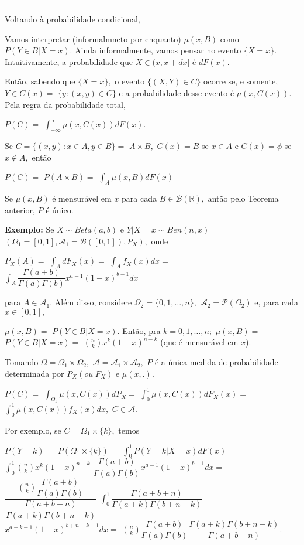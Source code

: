 \documentclass[
]{book}
\begin{document}
\begin{center}\rule{0.5\linewidth}{0.5pt}\end{center}

Voltando à probabilidade condicional,

Vamos interpretar (informalmneto por enquanto) \(\mu(x,B)\) como \(P(Y\in B| X=x).\) Ainda informalmente, vamos pensar no evento \(\{X=x\}.\) Intuitivamente, a probabilidade que \(X\in (x,x+dx]\) é \(dF(x).\)

Então, sabendo que \(\{X=x\},\) o evento \(\{(X,Y)\in C\}\) ocorre se, e somente, \(Y \in C(x)=\) \(\{y:(x,y)\in C\}\) e a probabilidade desse evento é \(\mu(x,C(x)).\) Pela regra da probabilidade total,

\(P(C)=\) \(\int_{-\infty}^{\infty}\mu(x,C(x))dF(x).\)

Se \(C=\{(x,y): x\in A, y \in B\}=\) \(A\times B,\) \(C(x)=B\) se \(x\in A\) e \(C(x)=\phi\) se \(x \notin A,\) então

\(P(C)=\) \(P(A\times B)=\) \(\int_A \mu(x,B)dF(x)\)

Se \(\mu(x,B)\) é mensurável em \(x\) para cada \(B\in \mathcal{B}(\mathbb{R}),\) antão pelo Teorema anterior, \(P\) é único.

\textbf{Exemplo:} Se \(X \sim Beta(a,b)\) e \(Y|X=x \sim Ben(n,x)\) \((\Omega_1=[0,1],\mathcal{A}_1=\mathcal{B}([0,1]),P_X),\) onde

\(P_X(A)=\) \(\int_A dF_X(x)=\) \(\int_A f_X(x)dx=\) \(\int_A \dfrac{\Gamma(a+b)}{\Gamma(a)\Gamma(b)}x^{a-1}(1-x)^{b-1}dx\)

para \(A \in \mathcal{A}_1.\) Além disso, considere \(\Omega_2=\{0,1,\ldots,n\},\) \(\mathcal{A}_2=\mathcal{P}(\Omega_2)\) e, para cada \(x \in [0,1],\)

\(\mu(x,B)=\) \(P(Y \in B| X=x).\) Então, pra \(k=0,1,\ldots,n;\) \(\mu(x,B)=\) \(P(Y\in B| X=x)=\) \(\binom{n}{k}x^k(1-x)^{n-k}\) (que é mensurável em \(x\)).

Tomando \(\Omega=\Omega_1 \times \Omega_2,\) \(\mathcal{A}=\mathcal{A}_1 \times \mathcal{A}_2,\) \(P\) é a única medida de probabilidade determinada por \(P_X (ou \; F_X)\) e \(\mu(x,.).\)

\(P(C)=\) \(\int_{\Omega_1}\mu(x,C(x))dP_X=\) \(\int_0^1 \mu(x,C(x))dF_X(x)=\) \(\int_0^1 \mu(x,C(x))f_X(x)dx,\) \(C \in\mathcal{A}.\)

Por exemplo, se \(C=\Omega_1 \times \{k\},\) temos

\(P(Y=k)=\) \(P(\Omega_1 \times \{k\})=\) \(\int_0^1P(Y=k|X=x)dF(x)=\) \(\int_0^1 \binom{n}{k}x^k(1-x)^{n-k}\) \(\dfrac{\Gamma(a+b)}{\Gamma(a)\Gamma(b)}x^{a-1}(1-x)^{b-1}dx=\) \(\dfrac{\binom{n}{k}\dfrac{\Gamma(a+b)}{\Gamma(a)\Gamma(b)}}{\dfrac{\Gamma(a+b+n)}{\Gamma(a+k)\Gamma(b+n-k)}}\) \(\int_0^1\dfrac{\Gamma(a+b+n)}{\Gamma(a+k)\Gamma(b+n-k)}\) \(x^{a+k-1}(1-x)^{b+n-k-1}dx=\) \(\binom{n}{k}\dfrac{\Gamma(a+b)}{\Gamma(a)\Gamma(b)}\dfrac{\Gamma(a+k)\Gamma(b+n-k)}{\Gamma(a+b+n)}.\)
\end{document}
